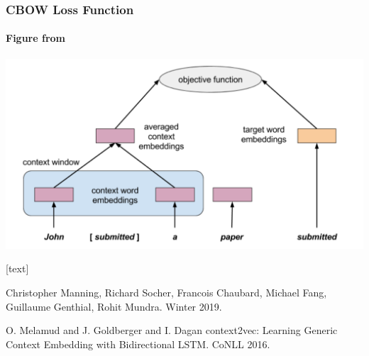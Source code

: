 \begin{frame}
\frametitle{CBOW Loss Function}
\framesubtitle{Figure from \cite{melamud16}}
\includegraphics[scale=.45]{figures/wordvectors/cbowloss}	
\end{frame}

\begin{frame}
[text]
\begin{thebibliography}{10}

\alert{Christopher Manning, Richard Socher, Francois Chaubard, Michael Fang, Guillaume Genthial, Rohit Mundra.}
\newblock Winter 2019.


\alert{O. Melamud and J. Goldberger and I. Dagan}
\newblock context2vec: Learning Generic Context Embedding with Bidirectional LSTM.
\newblock CoNLL 2016.
\end{thebibliography}
\end{frame}





